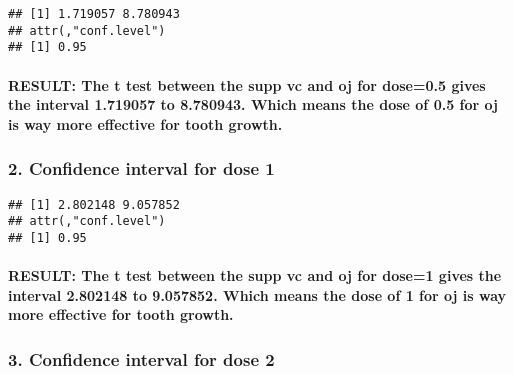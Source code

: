\documentclass[]{article}
\newenvironment{Shaded}{\begin{snugshade}}{\end{snugshade}}
\newcommand{\KeywordTok}[1]{\textcolor[rgb]{0.13,0.29,0.53}{\textbf{#1}}}
\newcommand{\DataTypeTok}[1]{\textcolor[rgb]{0.13,0.29,0.53}{#1}}
\newcommand{\DecValTok}[1]{\textcolor[rgb]{0.00,0.00,0.81}{#1}}
\newcommand{\OperatorTok}[1]{\textcolor[rgb]{0.81,0.36,0.00}{\textbf{#1}}}
\newcommand{\NormalTok}[1]{#1}
\let\oldparagraph\paragraph
\renewcommand{\paragraph}[1]{\oldparagraph{#1}\mbox{}}
\begin{document}
\begin{verbatim}
## [1] 1.719057 8.780943
## attr(,"conf.level")
## [1] 0.95
\end{verbatim}

\paragraph{RESULT: The t test between the supp vc and oj for dose=0.5
gives the interval 1.719057 to 8.780943. Which means the dose of 0.5 for
oj is way more effective for tooth
growth.}\label{result-the-t-test-between-the-supp-vc-and-oj-for-dose0.5-gives-the-interval-1.719057-to-8.780943.-which-means-the-dose-of-0.5-for-oj-is-way-more-effective-for-tooth-growth.}

\subsubsection{2. Confidence interval for dose
1}\label{confidence-interval-for-dose-1}

\begin{Shaded}
\end{Shaded}

\begin{verbatim}
## [1] 2.802148 9.057852
## attr(,"conf.level")
## [1] 0.95
\end{verbatim}

\paragraph{RESULT: The t test between the supp vc and oj for dose=1
gives the interval 2.802148 to 9.057852. Which means the dose of 1 for
oj is way more effective for tooth
growth.}\label{result-the-t-test-between-the-supp-vc-and-oj-for-dose1-gives-the-interval-2.802148-to-9.057852.-which-means-the-dose-of-1-for-oj-is-way-more-effective-for-tooth-growth.}

\subsubsection{3. Confidence interval for dose
2}\label{confidence-interval-for-dose-2}
\end{document}
